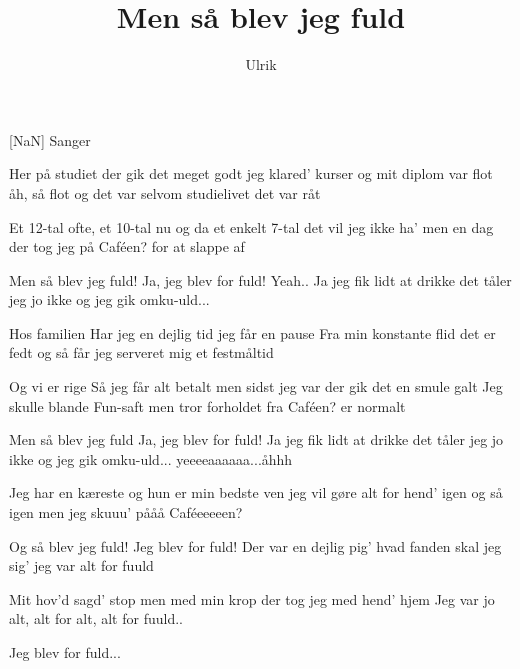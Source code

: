 \documentclass[a4paper,11pt]{article}
\title{Men så blev jeg fuld}
\author{Ulrik}
\begin{document}
\maketitle

\begin{roles}
[NaN] Sanger
\end{roles}

\begin{song}
 Her på studiet der gik det meget godt
jeg klared' kurser og mit diplom var flot
åh, så flot
og det var selvom studielivet det var råt

 Et 12-tal ofte, et 10-tal nu og da
et enkelt 7-tal det vil jeg ikke ha'
men en dag
der tog jeg på Caféen? for at slappe af

 Men så blev jeg fuld!
Ja, jeg blev for fuld!
Yeah..
Ja jeg fik lidt at drikke
det tåler jeg jo ikke
og jeg gik omku-uld...

 Hos familien
Har jeg en dejlig tid
jeg får en pause
Fra min konstante flid
det er fedt
og så får jeg serveret mig et festmåltid

 Og vi er rige
Så jeg får alt betalt
men sidst jeg var der
gik det en smule galt
Jeg skulle blande Fun-saft
men tror forholdet fra Caféen? er normalt

 Men så blev jeg fuld
Ja, jeg blev for fuld!
Ja jeg fik lidt at drikke
det tåler jeg jo ikke
og jeg gik omku-uld...
yeeeeaaaaaa...åhhh

 Jeg har en kæreste og hun er min bedste ven
jeg vil gøre alt for hend' igen og så igen
men jeg skuuu' pååå Caféeeeeen?

 Og så blev jeg fuld!
Jeg blev for fuld!
Der var en dejlig pig'
hvad fanden skal jeg sig'
jeg var alt for fuuld

 Mit hov'd sagd' stop
men med min krop
der tog jeg med hend' hjem
Jeg var jo alt, alt for
alt, alt for fuuld..

 Jeg blev for fuld...
\end{song}
\end{document}
